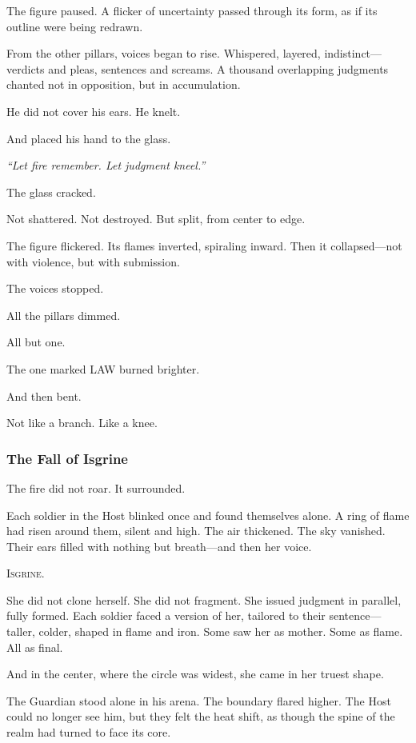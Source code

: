 \documentclass[12pt]{article}
\begin{document}
The figure paused. A flicker of uncertainty passed through its form, as if its outline were being redrawn.

From the other pillars, voices began to rise. Whispered, layered, indistinct—verdicts and pleas, sentences and screams. A thousand overlapping judgments chanted not in opposition, but in accumulation.

He did not cover his ears. He knelt.

And placed his hand to the glass.

\textit{``Let fire remember. Let judgment kneel.''}

The glass cracked.

Not shattered. Not destroyed. But split, from center to edge.

The figure flickered. Its flames inverted, spiraling inward. Then it collapsed—not with violence, but with submission.

The voices stopped.

All the pillars dimmed.

All but one.

The one marked \textsc{LAW} burned brighter.

And then bent.

Not like a branch. Like a knee.


\dotfill

\subsubsection*{The Fall of Isgrine}

The fire did not roar. It surrounded.

Each soldier in the Host blinked once and found themselves alone. A ring of flame had risen around them, silent and high. The air thickened. The sky vanished. Their ears filled with nothing but breath—and then her voice.

\textsc{Isgrine.}

She did not clone herself. She did not fragment. She issued judgment in parallel, fully formed. Each soldier faced a version of her, tailored to their sentence—taller, colder, shaped in flame and iron. Some saw her as mother. Some as flame. All as final.

And in the center, where the circle was widest, she came in her truest shape.

The Guardian stood alone in his arena. The boundary flared higher. The Host could no longer see him, but they felt the heat shift, as though the spine of the realm had turned to face its core.
\end{document}
